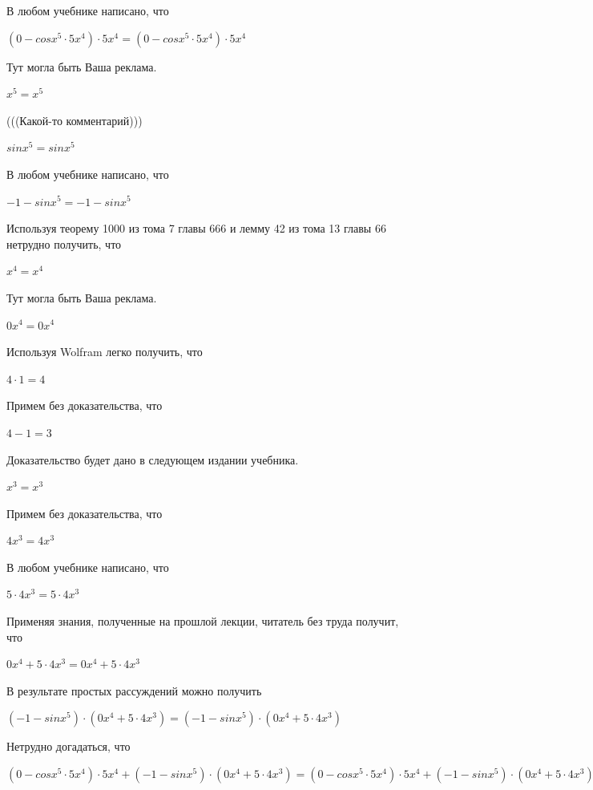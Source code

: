 \documentclass[12pt,a4paper,fleqn]{article}
\theoremstyle{definition}
\begin{document}
В любом учебнике написано, что 

$( 0  - cos{ x }^{ 5 } \cdot  5 { x }^{ 4 }) \cdot  5 { x }^{ 4 } = ( 0  - cos{ x }^{ 5 } \cdot  5 { x }^{ 4 }) \cdot  5 { x }^{ 4 }$

Тут могла быть Ваша реклама. 

${ x }^{ 5 } = { x }^{ 5 }$

(((Какой-то комментарий))) 

$sin{ x }^{ 5 } = sin{ x }^{ 5 }$

В любом учебнике написано, что 

$ -1  - sin{ x }^{ 5 } =  -1  - sin{ x }^{ 5 }$

Используя теорему 1000 из тома 7 главы 666 и лемму 42 из тома 13 главы 66 нетрудно получить, что 

${ x }^{ 4 } = { x }^{ 4 }$

Тут могла быть Ваша реклама. 

$ 0 { x }^{ 4 } =  0 { x }^{ 4 }$

Используя Wolfram легко получить, что 

$ 4  \cdot  1  =  4 $

Примем без доказательства, что 

$ 4  -  1  =  3 $

Доказательство будет дано в следующем издании учебника. 

${ x }^{ 3 } = { x }^{ 3 }$

Примем без доказательства, что 

$ 4 { x }^{ 3 } =  4 { x }^{ 3 }$

В любом учебнике написано, что 

$ 5  \cdot  4 { x }^{ 3 } =  5  \cdot  4 { x }^{ 3 }$

Применяя знания, полученные на прошлой лекции, читатель без труда получит, что 

$ 0 { x }^{ 4 } +  5  \cdot  4 { x }^{ 3 } =  0 { x }^{ 4 } +  5  \cdot  4 { x }^{ 3 }$

В результате простых рассуждений можно получить 

$( -1  - sin{ x }^{ 5 }) \cdot ( 0 { x }^{ 4 } +  5  \cdot  4 { x }^{ 3 }) = ( -1  - sin{ x }^{ 5 }) \cdot ( 0 { x }^{ 4 } +  5  \cdot  4 { x }^{ 3 })$

Нетрудно догадаться, что 

$( 0  - cos{ x }^{ 5 } \cdot  5 { x }^{ 4 }) \cdot  5 { x }^{ 4 } + ( -1  - sin{ x }^{ 5 }) \cdot ( 0 { x }^{ 4 } +  5  \cdot  4 { x }^{ 3 }) = ( 0  - cos{ x }^{ 5 } \cdot  5 { x }^{ 4 }) \cdot  5 { x }^{ 4 } + ( -1  - sin{ x }^{ 5 }) \cdot ( 0 { x }^{ 4 } +  5  \cdot  4 { x }^{ 3 })$
\end{document}
